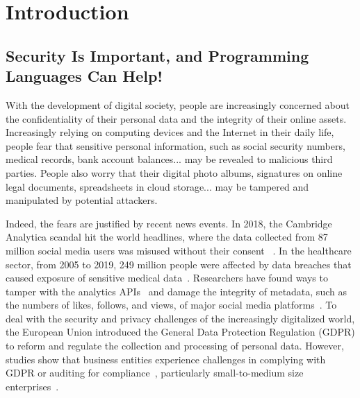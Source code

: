 \chapter{Introduction}
\label{ch:intro}

\section{Security Is Important, and Programming Languages Can Help!}

With the development of digital society, people are increasingly concerned about
the confidentiality of their personal data and the integrity of their online
assets. Increasingly relying on computing devices and the Internet in their
daily life, people fear that sensitive personal information, such as social
security numbers, medical records, bank account balances... may be revealed to
malicious third parties. People also worry that their digital photo albums,
signatures on online legal documents, spreadsheets in cloud storage... may be
tampered and manipulated by potential attackers.

Indeed, the fears are justified by recent news events. In 2018, the Cambridge
Analytica scandal hit the world headlines, where the data collected from 87
million social media users was misused without their consent
~\parencite{cadwalladr2018facebook,kitchgaessner2017cambridge,gonzalez2019global,hinds2020wouldn}.
In the healthcare sector, from 2005 to 2019, 249 million people were
affected by data breaches that caused exposure of sensitive medical
data~\parencite{seh2020healthcare}. Researchers have found ways to tamper with the
analytics APIs~\parencite{pfeffer2018tampering} and damage the integrity of
metadata, such as the numbers of likes, follows, and views, of major social
media platforms~\parencite{paquet2017can}. To deal with the security and privacy
challenges of the increasingly digitalized world, the European Union introduced
the General Data Protection Regulation (GDPR) to reform and regulate the
collection and processing of personal data. However, studies show that business
entities experience challenges in complying with GDPR or auditing for
compliance~\parencite{smirnova2024understanding}, particularly small-to-medium
size enterprises~\parencite{sirur2018we,freitas2018gdpr,harting2021impacts}.

